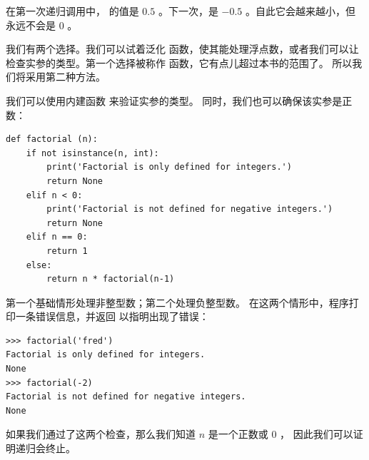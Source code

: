 在第一次递归调用中， 的值是 $0.5$ 。下一次，是 $-0.5$ 。自此它会越来越小，但永远不会是 $0$ 。


我们有两个选择。我们可以试着泛化  函数，使其能处理浮点数，或者我们可以让  检查实参的类型。第一个选择被称作  函数，它有点儿超过本书的范围了。 所以我们将采用第二种方法。


我们可以使用内建函数  来验证实参的类型。 同时，我们也可以确保该实参是正数：
  

\begin{lstlisting}
def factorial (n):
    if not isinstance(n, int):
        print('Factorial is only defined for integers.')
        return None
    elif n < 0:
        print('Factorial is not defined for negative integers.')
        return None
    elif n == 0:
        return 1
    else:
        return n * factorial(n-1)
\end{lstlisting}

%

第一个基础情形处理非整型数；第二个处理负整型数。
在这两个情形中，程序打印一条错误信息，并返回  以指明出现了错误：


\begin{lstlisting}
>>> factorial('fred')
Factorial is only defined for integers.
None
>>> factorial(-2)
Factorial is not defined for negative integers.
None
\end{lstlisting}

%

如果我们通过了这两个检查，那么我们知道 $n$ 是一个正数或 $0$ ， 因此我们可以证明递归会终止。
  


